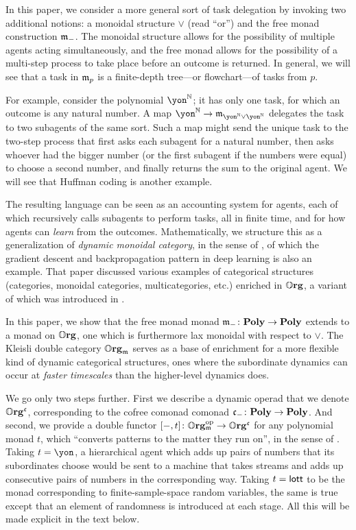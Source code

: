 In this paper, we consider a more general sort of task delegation by invoking two additional notions: a monoidal structure $\vee$ (read ``or'') and the free monad construction $\mathfrak{m}_-$. The monoidal structure allows for the possibility of multiple agents acting simultaneously, and the free monad allows for the possibility of a multi-step process to take place before an outcome is returned. In general, we will see that a task in $\mathfrak{m}_p$ is a finite-depth tree---or flowchart---of tasks from $p$. 

For example, consider the polynomial $\yon^\nn$; it has only one task, for which an outcome is any natural number. A map $\yon^\nn\to\free_{\yon^\nn\vee\yon^\nn}$ delegates the task to two subagents of the same sort. Such a map might send the unique task to the two-step process that first asks each subagent for a natural number, then asks whoever had the bigger number (or the first subagent if the numbers were equal) to choose a second number, and finally returns the sum to the original agent. We will see that Huffman coding is another example.

The resulting language can be seen as an accounting system for agents, each of which recursively calls subagents to perform tasks, all in finite time, and for how agents can \emph{learn} from the outcomes. Mathematically, we structure this as a generalization of \emph{dynamic monoidal category}, in the sense of \cite{shapiro2022dynamic}, of which the gradient descent and backpropagation pattern in deep learning is also an example. That paper discussed various examples of categorical structures (categories, monoidal categories, multicategories, etc.) enriched in $\mathbb{O}\mathbf{rg}$, a variant of which was introduced in \cite[Def 2.19]{spivak2021learnersv1}. 

In this paper, we show that the free monad monad $\mathfrak{m}_-\colon\mathbf{Poly}\to\mathbf{Poly}$ extends to a monad on $\mathbb{O}\mathbf{rg}$, one which is furthermore lax monoidal with respect to $\vee$. The Kleisli double category $\mathbb{O}\mathbf{rg}_{\mathfrak{m}}$ serves as a base of enrichment for a more flexible kind of dynamic categorical structures, ones where the subordinate dynamics can occur at \emph{faster timescales} than the higher-level dynamics does.

We go only two steps further. First we describe a dynamic operad that we denote $\mathbb{O}\mathbf{rg}^{\mathfrak{c}}$, corresponding to the cofree comonad comonad $\mathfrak{c}_-\colon\mathbf{Poly}\to\mathbf{Poly}$. And second, we provide a double functor $[-,t]\colon\mathbb{O}\mathbf{rg}_{\mathfrak{m}}^{\textnormal{op}}\to\mathbb{O}\mathbf{rg}^{\mathfrak{c}}$ for any polynomial monad $t$, which ``converts patterns to the matter they run on'', in the sense of \cite{libkind2024pattern}. Taking $t=\yon$, a hierarchical agent which adds up pairs of numbers that its subordinates choose would be sent to a machine that takes streams and adds up consecutive pairs of numbers in the corresponding way. Taking $t=\mathsf{lott}$ to be the monad corresponding to finite-sample-space random variables, the same is true except that an element of randomness is introduced at each stage. All this will be made explicit in the text below.


